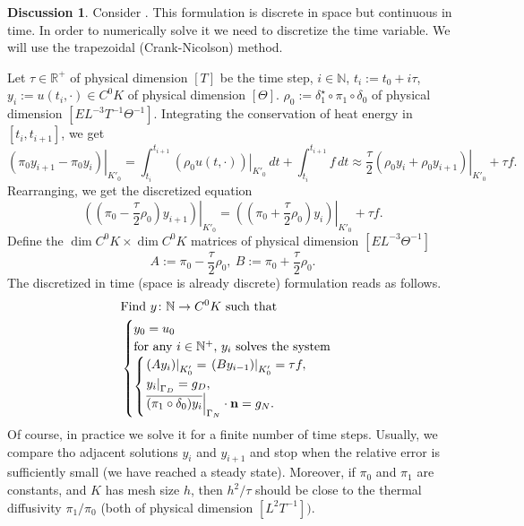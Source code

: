\documentclass[fleqn]{article}
\theoremstyle{definition}
\newtheorem{discussion}[theorem]{Discussion}
\newcommand{\N}{\mathbb{N}}
\newcommand{\R}{\mathbb{R}}
\newcommand{\restrict}[2]{\left. #1 \right|_{#2}}
\begin{document}
\begin{discussion}
  Consider .
  This formulation is discrete in space but continuous in time.
  In order to numerically solve it we need to discretize the time variable.
  We will use the trapezoidal (Crank-Nicolson) method.

  Let
    $\tau \in \R^+$ of physical dimension $[T]$ be the time step,
    $i \in \N$,
    $t_i := t_0 + i \tau$,
    $y_i := u(t_i, \cdot) \in C^0 K$ of physical dimension $[\Theta]$.
    $\rho_0 := \delta_1^\star \circ \pi_1 \circ \delta_0$
      of physical dimension $[E L^{-3} T^{-1} \Theta^{-1}]$.
  Integrating the conservation of heat energy in $[t_i, t_{i + 1}]$, we get
  \begin{equation}
    \restrict{(\pi_0 y_{i + 1} - \pi_0 y_i)}{K'_0}
    =   \int_{t_i}^{t_{i + 1}} \restrict{(\rho_0 u(t, \cdot))}{K'_0}\, d t
      + \int_{t_i}^{t_{i + 1}} f\, d t
    \approx
    \frac{\tau}{2} \restrict{(\rho_0 y_i + \rho_0 y_{i + 1})}{K'_0} + \tau f.
  \end{equation}
  Rearranging, we get the discretized equation
  \begin{equation}
    \restrict{((\pi_0 - \frac{\tau}{2} \rho_0) y_{i + 1})}{K'_0}
    = \restrict{((\pi_0 + \frac{\tau}{2} \rho_0) y_i)}{K'_0} + \tau f.
  \end{equation}
  Define the $\dim C^0 K \times \dim C^0 K$ matrices of physical dimension
  $[E L^{-3} \Theta^{-1}]$
  \begin{equation}
    A := \pi_0 - \frac{\tau}{2} \rho_0,\ B := \pi_0 + \frac{\tau}{2} \rho_0.
  \end{equation}
  The discretized in time (space is already discrete) formulation reads as
  follows.
  \begin{equation}
    \begin{split}
      & \text{Find $y \colon \N \to C^0 K$ such that} \\
      &
      \begin{cases}
        y_0 = u_0 \\
        \text{for any $i \in \N^+$, $y_i$ solves the system} \\
        \begin{cases}
          \restrict{(A y_i)}{K'_0} = \restrict{(B y_{i - 1})}{K'_0} = \tau f, \\
          \restrict{y_i}{\Gamma_D} = g_D, \\
          \restrict{\overline{(\pi_1 \circ \delta_0) y_i}}{\Gamma_N}
            \cdot {\bf n} = g_N.
        \end{cases}
      \end{cases}
    \end{split}
  \end{equation}
  Of course, in practice we solve it for a finite number of time steps.
  Usually, we compare tho adjacent solutions $y_i$ and $y_{i + 1}$ and stop when
  the relative error is sufficiently small (we have reached a steady state).
  Moreover, if $\pi_0$ and $\pi_1$ are constants, and $K$ has mesh size $h$,
  then $h^2 / \tau$ should be close to the thermal diffusivity $\pi_1 / \pi_0$
  (both of physical dimension $[L^2 T^{-1}])$.
\end{discussion}
\end{document}
